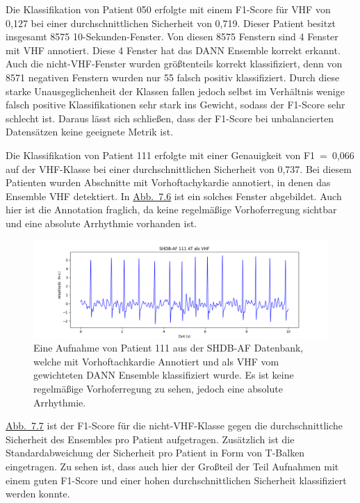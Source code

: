 Die Klassifikation von Patient 050 erfolgte mit einem F1-Score für \gls{VHF} von 0,127 bei einer durchschnittlichen Sicherheit von 0,719. Dieser Patient besitzt insgesamt 8575 10-Sekunden-Fenster. Von diesen 8575 Fenstern sind 4 Fenster mit \gls{VHF} annotiert. Diese 4 Fenster hat das \gls{DANN} Ensemble korrekt erkannt. Auch die nicht-\gls{VHF}-Fenster wurden größtenteils korrekt klassifiziert, denn von 8571 negativen Fenstern wurden nur 55 falsch positiv klassifiziert. Durch diese starke Unausgeglichenheit der Klassen fallen jedoch selbst im Verhältnis wenige falsch positive Klassifikationen sehr stark ins Gewicht, sodass der F1-Score sehr schlecht ist. Daraus lässt sich schließen, dass der F1-Score bei unbalancierten Datensätzen keine geeignete Metrik ist.

Die Klassifikation von Patient 111 erfolgte mit einer Genauigkeit von F1~=~0,066 auf der \gls{VHF}-Klasse bei einer durchschnittlichen Sicherheit von 0,737. Bei diesem Patienten wurden Abschnitte mit Vorhoftachykardie annotiert, in denen das Ensemble \gls{VHF} detektiert. In \hyperref[fig:shdb_111_at]{Abb.~7.6} ist ein solches Fenster abgebildet. Auch hier ist die Annotation fraglich, da keine regelmäßige Vorhoferregung sichtbar und eine absolute Arrhythmie vorhanden ist.

\begin{figure}[!ht]%
\centering
	\includegraphics[width=1\textwidth]{./Bilder/111_at.png}
\caption[SHDB-AF Aufnahme von Patient 111 mit AT Annotation]{Eine Aufnahme von Patient 111 aus der SHDB-AF Datenbank, welche mit Vorhoftachkardie Annotiert und als \gls{VHF} vom gewichteten \gls{DANN} Ensemble klassifiziert wurde. Es ist keine regelmäßige Vorhoferregung zu sehen, jedoch eine absolute Arrhythmie.} 
\label{fig:shdb_111_at}
\end{figure}

\hyperref[fig:shdb_scatter_vhf]{Abb.~7.7} ist der F1-Score für die nicht-\gls{VHF}-Klasse gegen die durchschnittliche Sicherheit des Ensembles  pro Patient aufgetragen. Zusätzlich ist die Standardabweichung der Sicherheit pro Patient in Form von T-Balken eingetragen. Zu sehen ist, dass auch hier der Großteil der Teil Aufnahmen mit einem guten F1-Score und einer hohen durchschnittlichen Sicherheit klassifiziert werden konnte.


